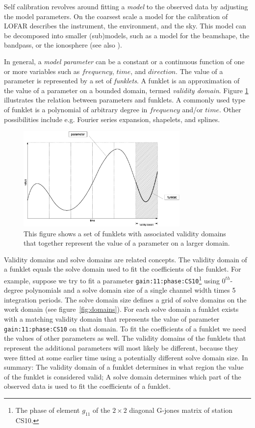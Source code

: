 \documentclass[10pt]{lofar}
\begin{document}
Self calibration revolves around fitting a \emph{model} to the observed data by
adjusting the model parameters. On the coarsest scale a model for the
calibration of LOFAR describes the instrument, the environment, and the sky.
This model can be decomposed into smaller (sub)models, such as a model for the
beamshape, the bandpass, or the ionosphere (see also
\cite[sec.2]{LOFAR-ASTRON-SDD-050}).

In general, a \emph{model parameter} can be a constant or a continuous function
of one or more variables such as $frequency$, $time$, and $direction$. The value
of a parameter is represented by a set of \emph{funklets}. A funklet is an
approximation of the value of a parameter on a bounded domain, termed
\emph{validity domain}. Figure \ref{fig:funklet} illustrates the relation
between parameters and funklets. A commonly used type of funklet is a polynomial
of arbitrary degree in $frequency$ and/or $time$. Other possibilities include
e.g. Fourier series expansion, shapelets, and splines.

\begin{figure}[htbp]
\centering
\includegraphics[width=0.75\textwidth]{images/funklet.eps}
\caption{This figure shows a set of funklets with associated validity domains
that together represent the value of a parameter on a larger domain.}
\label{fig:funklet}
\end{figure}

Validity domains and solve domains are related concepts. The validity domain of
a funklet equals the solve domain used to fit the coefficients of the funklet.
For example, suppose we try to fit a parameter
\texttt{gain:11:phase:CS10}\footnote{The phase of element $g_{11}$ of the $2
\times 2$ diagonal G-jones matrix of station CS10.} using $0^{th}$-degree
polynomials and a solve domain size of a single channel width times 5
integration periods. The solve domain size defines a grid of solve domains on
the work domain (see figure~\ref{fig:domains}). For each solve domain a funklet
exists with a matching validity domain that represents the value of parameter
\texttt{gain:11:phase:CS10} on that domain. To fit the coefficients of a funklet
we need the values of other parameters as well. The validity domains of the
funklets that represent the additional parameters will most likely be different,
because they were fitted at some earlier time using a potentially different
solve domain size. In summary: The validity domain of a funklet determines in
what region the value of the funklet is considered valid; A solve domain
determines which part of the observed data is used to fit the coefficients of a
funklet.
\end{document}
